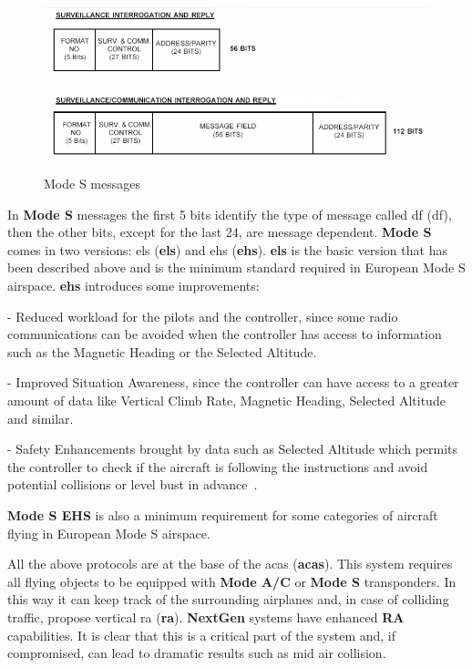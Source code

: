 \documentclass[../main.tex]{subfiles}
\begin{document}
\begin{figure}[htp]
  \centering
  \includegraphics[scale=0.65]{images/modes.png}
  \caption{Mode S messages}
  \label{fig:modes}
\end{figure}

In \textbf{Mode S} messages the first 5 bits identify the type of message called \acrlong{df} (\acrshort{df}), then the other bits, except for the last 24, are message dependent. \textbf{Mode S} comes in two versions: \acrlong{els} (\textbf{\acrshort{els}}) and \acrlong{ehs} (\textbf{\acrshort{ehs}}). \textbf{\acrshort{els}} is the basic version that has been described above and is the minimum standard required in European Mode S airspace. \textbf{\acrshort{ehs}} introduces some improvements:

- Reduced workload for the pilots and the controller, since some radio communications can be avoided when the controller has access to information such as the Magnetic Heading or the Selected Altitude.

- Improved Situation Awareness, since the controller can have access to a greater amount of data like Vertical Climb Rate, Magnetic Heading, Selected Altitude and similar.

- Safety Enhancements brought by data such as Selected Altitude which permits the controller to check if the aircraft is following the instructions and avoid potential collisions or level bust in advance~\cite{modesbook}.

\textbf{Mode S EHS} is also a minimum requirement for some categories of aircraft flying in European Mode S airspace.

All the above protocols are at the base of the \acrlong{acas} (\textbf{\acrshort{acas}}). This system requires all flying objects to be equipped with \textbf{Mode A/C} or \textbf{Mode S} transponders. In this way it can keep track of the surrounding airplanes and, in case of colliding traffic, propose vertical \acrlong{ra} (\textbf{\acrshort{ra}}). \textbf{NextGen} systems have enhanced \textbf{RA} capabilities. It is clear that this is a critical part of the system and, if compromised, can lead to dramatic results such as mid air collision.
\end{document}
